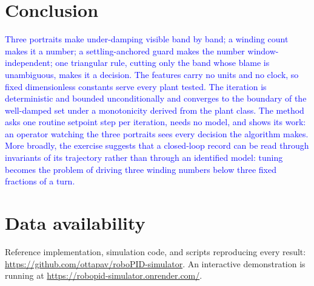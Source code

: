 \documentclass[final,3p,times,twocolumn]{elsarticle}
\newcommand{\revc}[1]{\textcolor{blue}{#1}} %
\newcommand{\revd}[1]{\textcolor{blue}{#1}} %
\newcommand{\revg}[1]{\textcolor{blue}{#1}} %
\begin{document}
\section{Conclusion}

\revc{Three portraits make under-damping visible band by band; a
winding count makes it a number; a settling-anchored guard makes the
number window-independent; one triangular rule, cutting only the band
whose blame is unambiguous, makes it a decision. The features carry no
units and no clock, so fixed dimensionless constants serve every plant
tested. The iteration is deterministic and bounded unconditionally and
converges to the boundary of the well-damped set under a monotonicity
derived from the plant class.} \revd{The method asks one routine
setpoint step per iteration, needs no model, and shows its work: an
operator watching the three portraits sees every decision the
algorithm makes.} \revg{More broadly, the exercise suggests that a
closed-loop record can be read through invariants of its trajectory
rather than through an identified model: tuning becomes the problem of
driving three winding numbers below three fixed fractions of a turn.}

\section*{Data availability}
Reference implementation, simulation code, and scripts reproducing every
result: \url{https://github.com/ottapav/roboPID-simulator}. An
interactive demonstration is running at
\url{https://robopid-simulator.onrender.com/}.
\end{document}
